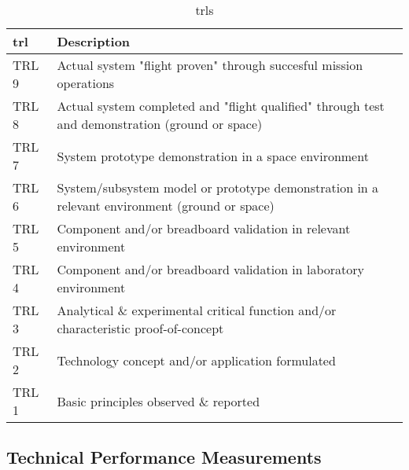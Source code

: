 \begin{table}
	\caption{ \glspl{trl} \cite{NationalAeronauticsandSpaceAdministration2007}}
	\begin{tabular}{|p{}|p{}|}
		\hline
		\textbf{\acrfull{trl}} & \textbf{Description} \\ \hline \hline
		\gls{TRL} 9& Actual system "flight proven" through succesful mission operations\\
		\gls{TRL} 8& Actual system completed and "flight qualified" through test and demonstration (ground or space)\\
		\gls{TRL} 7& System prototype demonstration in a space environment\\
		\gls{TRL} 6& System/subsystem model or prototype demonstration in a relevant environment (ground or space)\\
		\gls{TRL} 5& Component and/or breadboard validation in relevant environment\\
		\gls{TRL} 4& Component and/or breadboard validation in laboratory environment\\
		\gls{TRL} 3& Analytical \& experimental critical function and/or characteristic proof-of-concept\\
		\gls{TRL} 2& Technology concept and/or application formulated\\
		\gls{TRL} 1& Basic principles observed \& reported \\
		\hline
	\end{tabular}
\end{table}
\subsection{Technical Performance Measurements}
\label{subsec:tpms}